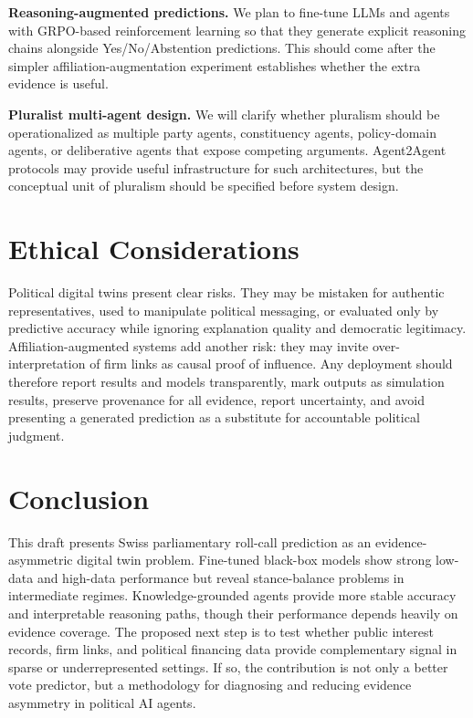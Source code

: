 \documentclass[letterpaper]{article}
\begin{document}
\textbf{Reasoning-augmented predictions.} We plan to fine-tune LLMs and agents with GRPO-based reinforcement learning so that they generate explicit reasoning chains alongside Yes/No/Abstention predictions. This should come after the simpler affiliation-augmentation experiment establishes whether the extra evidence is useful.

\textbf{Pluralist multi-agent design.} We will clarify whether pluralism should be operationalized as multiple party agents, constituency agents, policy-domain agents, or deliberative agents that expose competing arguments. Agent2Agent protocols may provide useful infrastructure for such architectures, but the conceptual unit of pluralism should be specified before system design.

\section{Ethical Considerations}

Political digital twins present clear risks. They may be mistaken for authentic representatives, used to manipulate political messaging, or evaluated only by predictive accuracy while ignoring explanation quality and democratic legitimacy. Affiliation-augmented systems add another risk: they may invite over-interpretation of firm links as causal proof of influence. Any deployment should therefore report results and models transparently, mark outputs as simulation results, preserve provenance for all evidence, report uncertainty, and avoid presenting a generated prediction as a substitute for accountable political judgment.

\section{Conclusion}

This draft presents Swiss parliamentary roll-call prediction as an evidence-asymmetric digital twin problem. Fine-tuned black-box models show strong low-data and high-data performance but reveal stance-balance problems in intermediate regimes. Knowledge-grounded agents provide more stable accuracy and interpretable reasoning paths, though their performance depends heavily on evidence coverage. The proposed next step is to test whether public interest records, firm links, and political financing data provide complementary signal in sparse or underrepresented settings. If so, the contribution is not only a better vote predictor, but a methodology for diagnosing and reducing evidence asymmetry in political AI agents.


\end{document}
